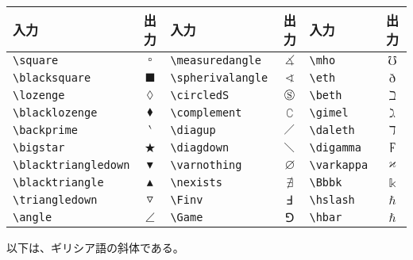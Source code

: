 \begin{longtable}{@{}lclclc@{}}
  入力                      & 出力                 & 入力                        & 出力                   & 入力                     & 出力                \\ \toprule
  \verb`\square           ` & $\square$            & \verb`\measuredangle      ` & $\measuredangle$       & \verb`\mho             ` & $\mho$              \\
  \verb`\blacksquare`       & $\blacksquare$       & \verb`\spherivalangle`      & $\sphericalangle$      & \verb`\eth`              & $\eth$              \\
  \verb`\lozenge`           & $\lozenge$           & \verb`\circledS`            & $\circledS$            & \verb`\beth`             & $\beth$             \\
  \verb`\blacklozenge`      & $\blacklozenge$      & \verb`\complement`          & $\complement$          & \verb`\gimel`            & $\gimel$            \\
  \verb`\backprime`         & $\backprime$         & \verb`\diagup`              & $\diagup$              & \verb`\daleth`           & $\daleth$           \\
  \verb`\bigstar`           & $\bigstar$           & \verb`\diagdown`            & $\diagdown$            & \verb`\digamma`          & $\digamma$          \\
  \verb`\blacktriangledown` & $\blacktriangledown$ & \verb`\varnothing`          & $\varnothing$          & \verb`\varkappa`         & $\varkappa$         \\
  \verb`\blacktriangle`     & $\blacktriangle$     & \verb`\nexists`             & $\nexists$             & \verb`\Bbbk`             & $\Bbbk$             \\
  \verb`\triangledown`      & $\triangledown$      & \verb`\Finv`                & $\Finv$                & \verb`\hslash`           & $\hslash$           \\
  \verb`\angle`             & $\angle$             & \verb`\Game`                & $\Game$                & \verb`\hbar`             & $\hbar$             \\
\end{longtable}
以下は、ギリシア語の斜体である。
